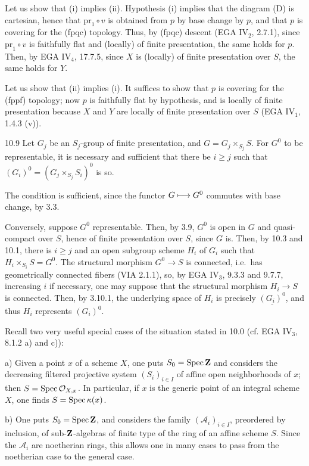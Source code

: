 Let us show that (i) implies (ii). Hypothesis (i) implies that the diagram (D) is cartesian, hence that $\mathrm{pr}_1\circ v$ is obtained from $p$ by base change by $p$, and that $p$ is covering for the (fpqc) topology. Thus, by (fpqc) descent (EGA IV$_2$, 2.7.1), since $\mathrm{pr}_1\circ v$ is faithfully flat and (locally) of finite presentation, the same holds for $p$. Then, by EGA IV$_4$, 17.7.5, since $X$ is (locally) of finite presentation over $S$, the same holds for $Y$.

Let us show that (ii) implies (i). It suffices to show that $p$ is covering for the (fppf) topology; now $p$ is faithfully flat by hypothesis, and is locally of finite presentation because $X$ and $Y$ are locally of finite presentation over $S$ (EGA IV$_1$, 1.4.3 (v)).

\begin{lemma}{10.9}\label{VIB.10.9}
Let $G_j$ be an $S_j$-group of finite presentation, and $G=G_j\times_{S_j}S$. For $G^0$ to be representable, it is necessary and sufficient that there be $i\geq j$ such that $(G_i)^0=(G_j\times_{S_j}S_i)^0$ is so.
\end{lemma}
The condition is sufficient, since the functor $G\longmapsto G^0$ commutes with base change, by 3.3.

Conversely, suppose $G^0$ representable. Then, by 3.9, $G^0$ is open in $G$ and quasi-compact over $S$, hence of finite presentation over $S$, since $G$ is. Then, by 10.3 and 10.1, there is $i\geq j$ and an open subgroup scheme $H_i$ of $G_i$ such that $H_i\times_{S_i}S=G^0$. The structural morphism $G^0\to S$ is connected, i.e.\ has geometrically connected fibers (VIA 2.1.1), so, by EGA IV$_3$, 9.3.3 and 9.7.7, increasing $i$ if necessary, one may suppose that the structural morphism $H_i\to S$ is connected. Then, by 3.10.1, the underlying space of $H_i$ is precisely $\underline{(G_i)^0}$, and thus $H_i$ represents $(G_i)^0$.

\label{VIB.10.10}
Recall two very useful special cases of the situation stated in 10.0 (cf. EGA IV$_3$, 8.1.2 a) and c)):

a) Given a point $x$ of a scheme $X$, one puts $S_0=\operatorname{Spec}\mathbf{Z}$ and considers the decreasing filtered projective system $(S_i)_{i\in I}$ of affine open neighborhoods of $x$; then $S=\operatorname{Spec}\mathcal{O}_{X,x}$. In particular, if $x$ is the generic point of an integral scheme $X$, one finds $S=\operatorname{Spec}\kappa(x)$.

b) One puts $S_0=\operatorname{Spec}\mathbf{Z}$, and considers the family $(\mathscr A_i)_{i\in I}$, preordered by inclusion, of sub-$\mathbf{Z}$-algebras of finite type of the ring of an affine scheme $S$. Since the $\mathscr A_i$ are noetherian rings, this allows one in many cases to pass from the noetherian case to the general case.

